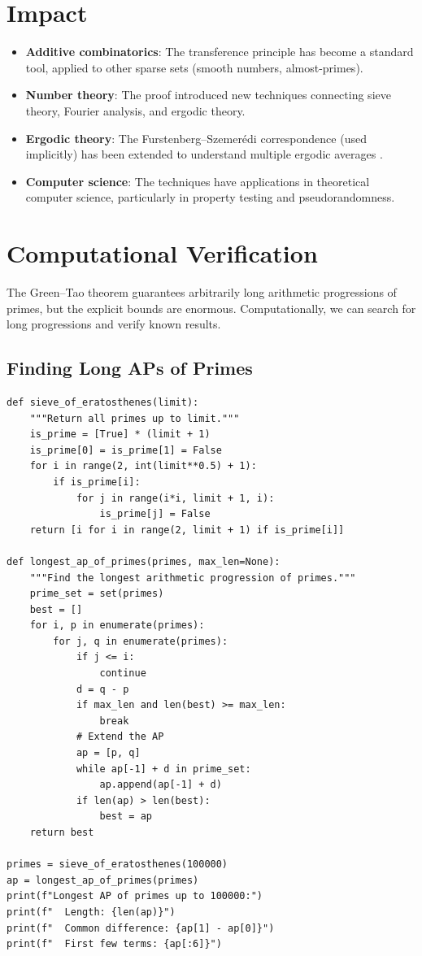 \section{Impact}

\begin{itemize}
\item \textbf{Additive combinatorics}: The transference principle has become a standard tool, applied to other sparse sets (smooth numbers, almost-primes).
\item \textbf{Number theory}: The proof introduced new techniques connecting sieve theory, Fourier analysis, and ergodic theory.
\item \textbf{Ergodic theory}: The Furstenberg--Szemer\'edi correspondence (used implicitly) has been extended to understand multiple ergodic averages \cite{furstenberg1977}.
\item \textbf{Computer science}: The techniques have applications in theoretical computer science, particularly in property testing and pseudorandomness.
\end{itemize}

\section{Computational Verification}

The Green--Tao theorem guarantees arbitrarily long arithmetic progressions of primes, but the explicit bounds are enormous. Computationally, we can search for long progressions and verify known results.

\subsection{Finding Long APs of Primes}

\begin{verbatim}
def sieve_of_eratosthenes(limit):
    """Return all primes up to limit."""
    is_prime = [True] * (limit + 1)
    is_prime[0] = is_prime[1] = False
    for i in range(2, int(limit**0.5) + 1):
        if is_prime[i]:
            for j in range(i*i, limit + 1, i):
                is_prime[j] = False
    return [i for i in range(2, limit + 1) if is_prime[i]]

def longest_ap_of_primes(primes, max_len=None):
    """Find the longest arithmetic progression of primes."""
    prime_set = set(primes)
    best = []
    for i, p in enumerate(primes):
        for j, q in enumerate(primes):
            if j <= i:
                continue
            d = q - p
            if max_len and len(best) >= max_len:
                break
            # Extend the AP
            ap = [p, q]
            while ap[-1] + d in prime_set:
                ap.append(ap[-1] + d)
            if len(ap) > len(best):
                best = ap
    return best

primes = sieve_of_eratosthenes(100000)
ap = longest_ap_of_primes(primes)
print(f"Longest AP of primes up to 100000:")
print(f"  Length: {len(ap)}")
print(f"  Common difference: {ap[1] - ap[0]}")
print(f"  First few terms: {ap[:6]}")
\end{verbatim}

